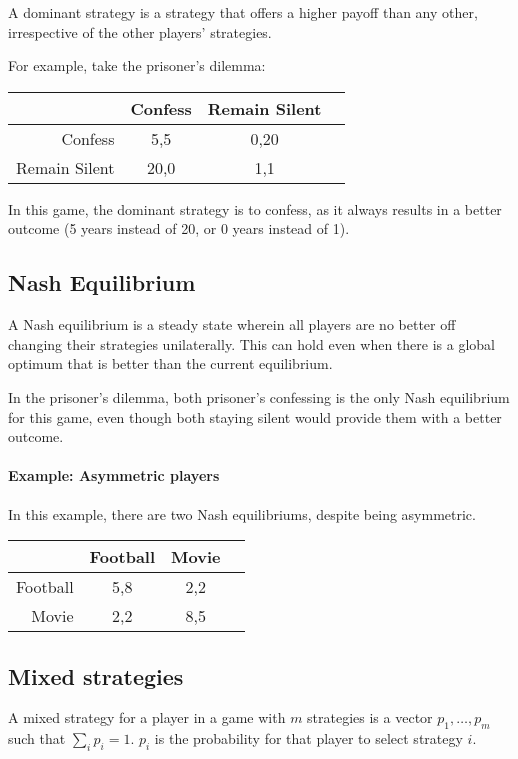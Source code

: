 \documentclass{idc_msc}
\begin{document}
A dominant strategy is a strategy that offers a higher payoff than any other, irrespective of the other players' strategies.

For example, take the prisoner's dilemma:

\begin{tabu} to \linewidth{|r|c|c|c|}
\hline
& Confess & Remain Silent \\
\hline
Confess & 5,5 & 0,20 \\
\hline
Remain Silent & 20,0 & 1,1 \\
\hline
\end{tabu}

In this game, the dominant strategy is to confess, as it always results in a better outcome (5 years instead of 20, or 0 years instead of 1).

\subsection{Nash Equilibrium}

A Nash equilibrium is a steady state wherein all players are no better off changing their strategies unilaterally.
This can hold even when there is a global optimum that is better than the current equilibrium.

In the prisoner's dilemma, both prisoner's confessing is the only Nash equilibrium for this game, even though both staying silent would provide them with a better outcome.

\paragraph{Example: Asymmetric players}

In this example, there are two Nash equilibriums, despite being asymmetric.

\begin{tabu} to \linewidth{|r|c|c|c|}
\hline
& Football & Movie \\
\hline
Football & 5,8 & 2,2 \\
\hline
Movie & 2,2 & 8,5 \\
\hline
\end{tabu}

\subsection{Mixed strategies}

A mixed strategy for a player in a game with \(m\) strategies is a vector \(p_1,\ldots,p_m\) such that \(\sum_i p_i = 1\).
\(p_i\) is the probability for that player to select strategy \(i\).
\end{document}
